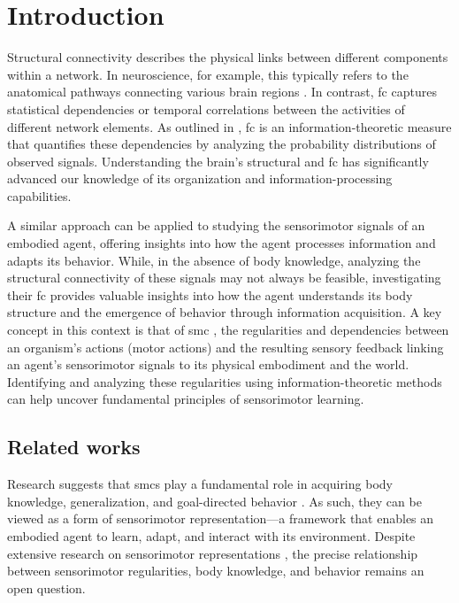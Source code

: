 \section{Introduction}\label{sec:intro}
Structural connectivity describes the physical links between different components within a network. In neuroscience, for example, this typically refers to the anatomical pathways connecting various brain regions \cite{Park2013StructuralAF}. In contrast, \ac{fc} captures statistical dependencies or temporal correlations between the activities of different network elements. As outlined in \cite{Friston2011FunctionalAE}, \ac{fc} is an information-theoretic measure that quantifies these dependencies by analyzing the probability distributions of observed signals. %
Understanding the brain’s structural and \ac{fc} has significantly advanced our knowledge of its organization and information-processing capabilities. 

A similar approach can be applied to studying the sensorimotor signals of an embodied agent, offering insights into how the agent processes information and adapts its behavior. While, in the absence of body knowledge, analyzing the structural connectivity of these signals may not always be feasible, investigating their \ac{fc} provides valuable insights into how the agent understands its body structure and the emergence of behavior through information acquisition. A key concept in this context is that of \ac{smc} \cite{oregan2001sensorimotor}, the regularities and dependencies between an organism's actions (motor actions) and the resulting sensory feedback linking an agent’s sensorimotor signals to its physical embodiment and the world. Identifying and analyzing these regularities using information-theoretic methods can help uncover fundamental principles of sensorimotor learning. 


\subsection{Related works}
Research suggests that \acp{smc} play a fundamental role in acquiring body knowledge, generalization, and goal-directed behavior \cite{Jacquey2019Sensorimotorcontingenciesas}. As such, they can be viewed as a form of sensorimotor representation---a framework that enables an embodied agent to learn, adapt, and interact with its environment. Despite extensive research on sensorimotor representations \cite{Nguyen2021Sensorimotorrepresentationlearning}, the precise relationship between sensorimotor regularities, body knowledge, and behavior remains an open question.

